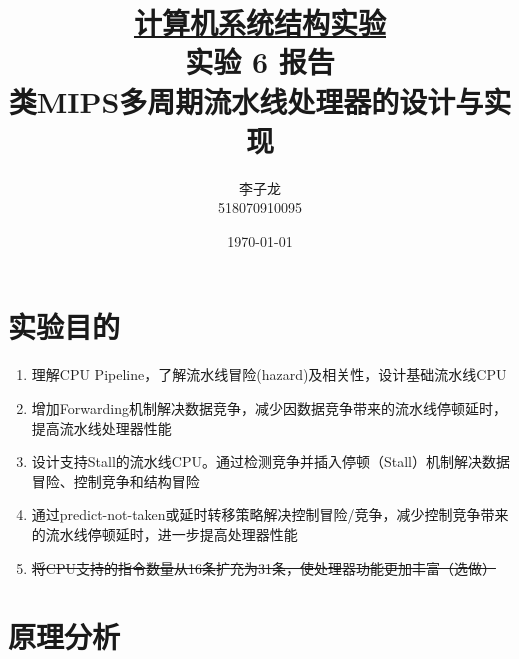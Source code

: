 \documentclass[a4paper,UTF8]{ctexart}
\begin{document}
\title{\normalsize \underline{计算机系统结构实验}\\\LARGE 实验 6 报告\\\vspace*{1em}\normalsize 类MIPS多周期流水线处理器的设计与实现}
\author{李子龙\\ 518070910095}
\date{\today}
\maketitle
\tableofcontents
\clearpage

\section{实验目的}

\begin{enumerate}
    \item 理解CPU Pipeline，了解流水线冒险(hazard)及相关性，设计基础流水线CPU
    \item 增加Forwarding机制解决数据竞争，减少因数据竞争带来的流水线停顿延时，提高流水线处理器性能
    \item 设计支持Stall的流水线CPU。通过检测竞争并插入停顿（Stall）机制解决数据冒险、控制竞争和结构冒险
    \item 通过predict-not-taken或延时转移策略解决控制冒险/竞争，减少控制竞争带来的流水线停顿延时，进一步提高处理器性能
    \item \sout{将CPU支持的指令数量从16条扩充为31条，使处理器功能更加丰富（选做）}
\end{enumerate}

\section{原理分析}
\end{document}

